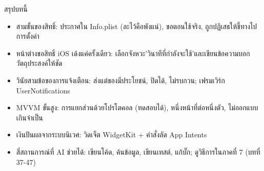 \begin{tcbsummary}{สรุปบทนี้}
\begin{itemize}
  \item สามขั้นของสิทธิ์: ประกาศใน Info.plist (ละไว้คือพังแน่), ขอตอนใช้จริง, ถูกปฏิเสธให้ชี้ทางไปการตั้งค่า
  \item หน้าต่างขอสิทธิ์ iOS เด้งแค่ครั้งเดียว: เลือกจังหวะ'วินาทีที่กำลังจะใช้'และเขียนข้อความบอกวัตถุประสงค์ให้ชัด
  \item วินัยสามข้อของการแจ้งเตือน: ส่งแต่ของมีประโยชน์, ปิดได้, ไม่รบกวน; เฟรมเวิร์ก UserNotifications
  \item MVVM ขั้นสูง: การแยกส่วนด้วยโปรโตคอล (ทดสอบได้), หนึ่งหน้าที่ต่อหนึ่งตัว, ไม่ออกแบบเกินจำเป็น
  \item เงินปันผลจากระบบนิเวศ: วิดเจ็ต WidgetKit + คำสั่งลัด App Intents
  \item สี่สถานการณ์ที่ AI ช่วยได้: เขียนโค้ด, ค้นข้อมูล, เขียนเทสต์, แก้บั๊ก; ดูวิธีการในภาคที่ 7 (บทที่ 37-47)
\end{itemize}

\end{tcbsummary}
